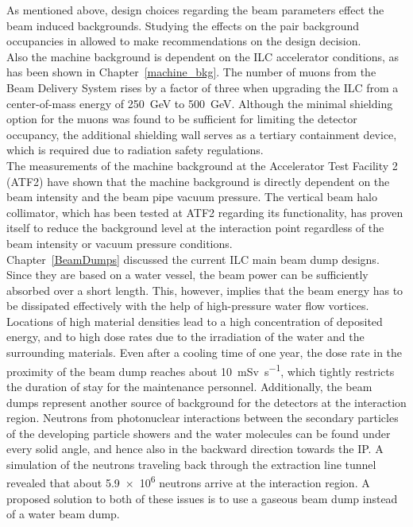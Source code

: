 As mentioned above, design choices regarding the beam parameters effect the beam induced backgrounds.
Studying the effects on the pair background occupancies in \sid allowed to make recommendations on the design decision.
\\Also the machine background is dependent on the ILC accelerator conditions, as has been shown in Chapter~\ref{machine_bkg}.
The number of muons from the Beam Delivery System rises by a factor of three when upgrading the ILC from a center-of-mass energy of \SI{250}{\GeV} to \SI{500}{\GeV}.
Although the minimal shielding option for the muons was found to be sufficient for limiting the \sid detector occupancy, the additional shielding wall serves as a tertiary containment device, which is required due to radiation safety regulations.
\\The measurements of the machine background at the Accelerator Test Facility 2 (ATF2) have shown that the machine background is directly dependent on the beam intensity and the beam pipe vacuum pressure.
The vertical beam halo collimator, which has been tested at ATF2 regarding its functionality, has proven itself to reduce the background level at the interaction point regardless of the beam intensity or vacuum pressure conditions.
\\Chapter~\ref{BeamDumps} discussed the current ILC main beam dump designs.
Since they are based on a water vessel, the beam power can be sufficiently absorbed over a short length.
This, however, implies that the beam energy has to be dissipated effectively with the help of high-pressure water flow vortices.
Locations of high material densities lead to a high concentration of deposited energy, and to high dose rates due to the irradiation of the water and the surrounding materials. 
Even after a cooling time of one year, the dose rate in the proximity of the beam dump reaches about \SI{10}{\milli\sievert\per\second}, which tightly restricts the duration of stay for the maintenance personnel.
Additionally, the beam dumps represent another source of background for the detectors at the interaction region.
Neutrons from photonuclear interactions between the secondary particles of the developing particle showers and the water molecules can be found under every solid angle, and hence also in the backward direction towards the IP.
A simulation of the neutrons traveling back through the extraction line tunnel revealed that about \num{5.9e6} neutrons arrive at the interaction region.
A proposed solution to both of these issues is to use a gaseous beam dump instead of a water beam dump.

